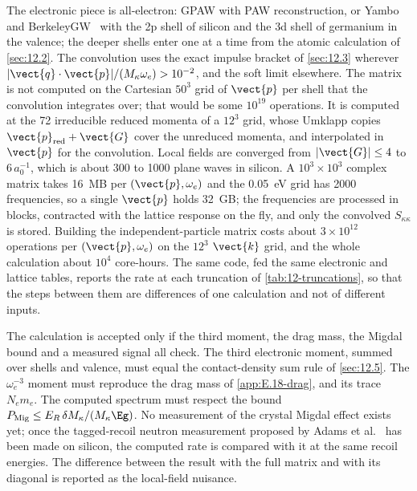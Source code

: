 The electronic piece is all-electron: GPAW with PAW reconstruction, or Yambo~\cite{sangalli2019many} and BerkeleyGW~\cite{deslippe2012berkeleygw} with the 2p shell of silicon and the 3d shell of germanium in the valence; the deeper shells enter one at a time from the atomic calculation of \cref{sec:12.2}. The convolution uses the exact impulse bracket of \cref{sec:12.3} wherever $|\vect{q}\cdot\vect{p}|/(M_\kappa\omega_e) > 10^{-2}$, and the soft limit elsewhere. The matrix is not computed on the Cartesian $50^3$ grid of $\vect{p}$ per shell that the convolution integrates over; that would be some $10^{19}$ operations. It is computed at the 72 irreducible reduced momenta of a $12^3$ grid, whose Umklapp copies $\vect{p}_{\mathrm{red}} + \vect{G}$ cover the unreduced momenta, and interpolated in $\vect{p}$ for the convolution. Local fields are converged from $|\vect{G}| \le 4$ to $6\,a_0^{-1}$, which is about 300 to 1000 plane waves in silicon. A $10^3\times10^3$ complex matrix takes \SI{16}{MB} per $(\vect{p},\omega_e)$ and the \SI{0.05}{eV} grid has 2000 frequencies, so a single $\vect{p}$ holds \SI{32}{GB}; the frequencies are processed in blocks, contracted with the lattice response on the fly, and only the convolved $S_{\kappa\kappa}$ is stored. Building the independent-particle matrix costs about $3\times10^{12}$ operations per $(\vect{p},\omega_e)$ on the $12^3$ $\vect{k}$ grid, and the whole calculation about $10^4$ core-hours. The same code, fed the same electronic and lattice tables, reports the rate at each truncation of \cref{tab:12-truncations}, so that the steps between them are differences of one calculation and not of different inputs.

The calculation is accepted only if the third moment, the drag mass, the Migdal bound and a measured signal all check. The third electronic moment, summed over shells and valence, must equal the contact-density sum rule of \cref{sec:12.5}. The $\omega_e^{-3}$ moment must reproduce the drag mass of \cref{app:E.18-drag}, and its trace $N_e m_e$. The computed spectrum must respect the bound $P_{\mathrm{Mig}} \le E_R\,\delta M_\kappa/(M_\kappa\Eg)$. No measurement of the crystal Migdal effect exists yet; once the tagged-recoil neutron measurement proposed by Adams et al.~\cite{adams2023measuring} has been made on silicon, the computed rate is compared with it at the same recoil energies. The difference between the result with the full matrix and with its diagonal is reported as the local-field nuisance.


